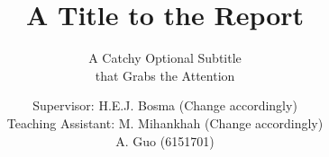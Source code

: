 \documentclass{tudelft-report}
\begin{document}
\frontmatter

\title{A Title to the Report}
\subtitle{A Catchy Optional Subtitle \\ that Grabs the Attention}
\author{\large Supervisor: H.E.J. Bosma (Change accordingly)\\ Teaching Assistant: M. Mihankhah (Change accordingly) \\
A. Guo (6151701)}

\subject{EEXNX: Integrated Project X} %

\makecover





\tableofcontents




\mainmatter









\setcounter{biburlnumpenalty}{7000}
\setcounter{biburllcpenalty}{7000}
\setcounter{biburlucpenalty}{7000}

\printbibliography[heading=bibintoc,title=Bibliography]


\appendix



\end{document}
